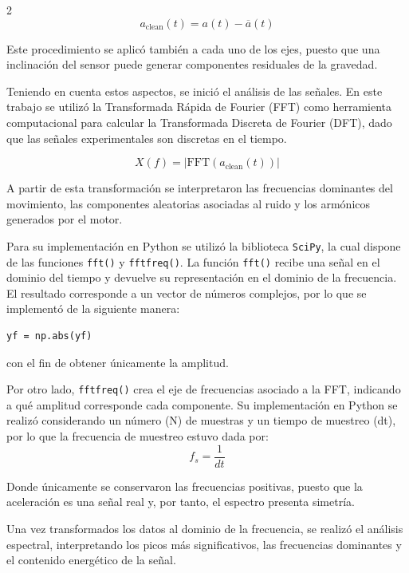 \documentclass[10pt]{article}
\begin{document}
\begin{multicols}{2}
\begin{equation}
a_{\mathrm{clean}}(t)=a(t)-\overline{a}(t)
\end{equation}

Este procedimiento se aplicó también a cada uno de los ejes, puesto que una inclinación del sensor puede generar componentes residuales de la gravedad.

Teniendo en cuenta estos aspectos, se inició el análisis de las señales. En este trabajo se utilizó la Transformada Rápida de Fourier (FFT) como herramienta computacional para calcular la Transformada Discreta de Fourier (DFT), dado que las señales experimentales son discretas en el tiempo.

\begin{equation}
X(f)=\left|\mathrm{FFT}\left(a_{\mathrm{clean}}(t)\right)\right|
\end{equation}

A partir de esta transformación se interpretaron las frecuencias dominantes del movimiento, las componentes aleatorias asociadas al ruido y los armónicos generados por el motor.

Para su implementación en Python se utilizó la biblioteca \texttt{SciPy}, la cual dispone de las funciones \texttt{fft()} y \texttt{fftfreq()}. La función \texttt{fft()} recibe una señal en el dominio del tiempo y devuelve su representación en el dominio de la frecuencia. El resultado corresponde a un vector de números complejos, por lo que se implementó de la siguiente manera:

\begin{lstlisting}
yf = np.abs(yf)
\end{lstlisting}

con el fin de obtener únicamente la amplitud.

Por otro lado, \texttt{fftfreq()} crea el eje de frecuencias asociado a la FFT, indicando a qué amplitud corresponde cada componente. Su implementación en Python se realizó considerando un número (N) de muestras y un tiempo de muestreo (dt), por lo que la frecuencia de muestreo estuvo dada por:
\begin{equation}
f_s=\frac{1}{dt}
\end{equation}

Donde únicamente se conservaron las frecuencias positivas, puesto que la aceleración es una señal real y, por tanto, el espectro presenta simetría.

Una vez transformados los datos al dominio de la frecuencia, se realizó el análisis espectral, interpretando los picos más significativos, las frecuencias dominantes y el contenido energético de la señal.


\end{multicols}
\end{document}

